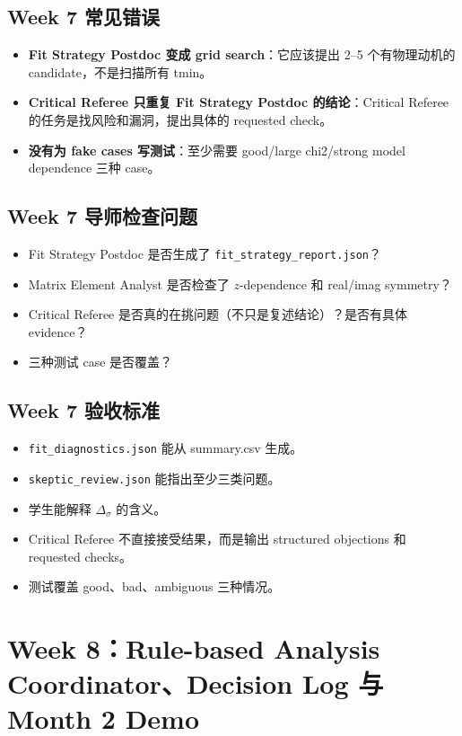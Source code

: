 \documentclass[11pt,a4paper,fontset=none]{ctexart}
\begin{document}
\subsection{Week 7 常见错误}
\begin{itemize}[leftmargin=2em]
  \item \textbf{Fit Strategy Postdoc 变成 grid search}：它应该提出 2--5 个有物理动机的 candidate，不是扫描所有 tmin。
  \item \textbf{Critical Referee 只重复 Fit Strategy Postdoc 的结论}：Critical Referee 的任务是找风险和漏洞，提出具体的 requested check。
  \item \textbf{没有为 fake cases 写测试}：至少需要 good/large chi2/strong model dependence 三种 case。
\end{itemize}

\subsection{Week 7 导师检查问题}
\begin{itemize}[leftmargin=2em]
  \item Fit Strategy Postdoc 是否生成了 \texttt{fit\_strategy\_report.json}？
  \item Matrix Element Analyst 是否检查了 $z$-dependence 和 real/imag symmetry？
  \item Critical Referee 是否真的在挑问题（不只是复述结论）？是否有具体 evidence？
  \item 三种测试 case 是否覆盖？
\end{itemize}

\subsection{Week 7 验收标准}

\begin{itemize}[leftmargin=2em]
  \item \texttt{fit\_diagnostics.json} 能从 summary.csv 生成。
  \item \texttt{skeptic\_review.json} 能指出至少三类问题。
  \item 学生能解释 \(\Delta_\sigma\) 的含义。
  \item Critical Referee 不直接接受结果，而是输出 structured objections 和 requested checks。
  \item 测试覆盖 good、bad、ambiguous 三种情况。
\end{itemize}

\newpage

\section{Week 8：Rule-based Analysis Coordinator、Decision Log 与 Month 2 Demo}
\end{document}
